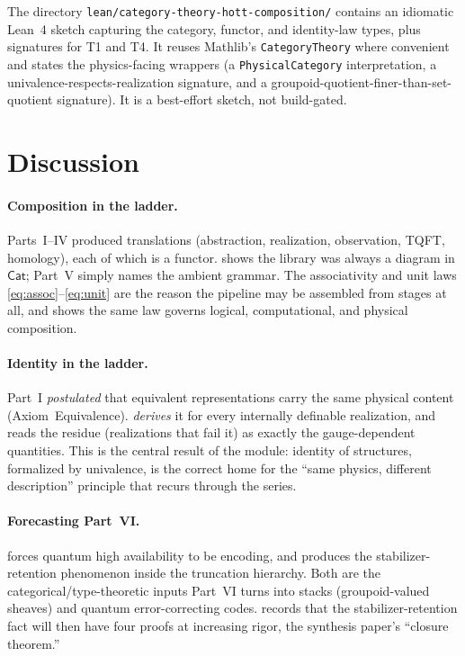 \documentclass[12pt]{article}
\theoremstyle{definition}
\theoremstyle{remark}
\newcommand{\Cat}{\mathsf{Cat}}
\begin{document}
The directory \texttt{lean/category-theory-hott-composition/} contains an
idiomatic Lean~4 sketch capturing the category, functor, and identity-law types,
plus signatures for T1 and T4. It reuses Mathlib's \texttt{CategoryTheory} where
convenient and states the physics-facing wrappers (a \texttt{PhysicalCategory}
interpretation, a univalence-respects-realization signature, and a
groupoid-quotient-finer-than-set-quotient signature). It is a best-effort sketch,
not build-gated.

\section{Discussion}
\label{sec:discussion}

\paragraph{Composition in the ladder.}
Parts~I--IV produced translations (abstraction, realization, observation, TQFT,
homology), each of which is a functor.  shows the
library was always a diagram in $\Cat$; Part~V simply names the ambient grammar.
The associativity and unit laws \eqref{eq:assoc}--\eqref{eq:unit} are the reason
the pipeline may be assembled from stages at all, and 
shows the same law governs logical, computational, and physical composition.

\paragraph{Identity in the ladder.}
Part~I \emph{postulated} that equivalent representations carry the same physical
content (Axiom~Equivalence).  \emph{derives} it for every
internally definable realization, and  reads the
residue (realizations that fail it) as exactly the gauge-dependent quantities.
This is the central result of the module: identity of structures, formalized by
univalence, is the correct home for the ``same physics, different description''
principle that recurs through the series.

\paragraph{Forecasting Part~VI.}
 forces quantum high availability to be encoding, and
 produces the stabilizer-retention phenomenon inside the
truncation hierarchy. Both are the categorical/type-theoretic inputs Part~VI
turns into stacks (groupoid-valued sheaves) and quantum error-correcting codes.
 records that the stabilizer-retention fact will then have
four proofs at increasing rigor, the synthesis paper's ``closure theorem.''
\end{document}
